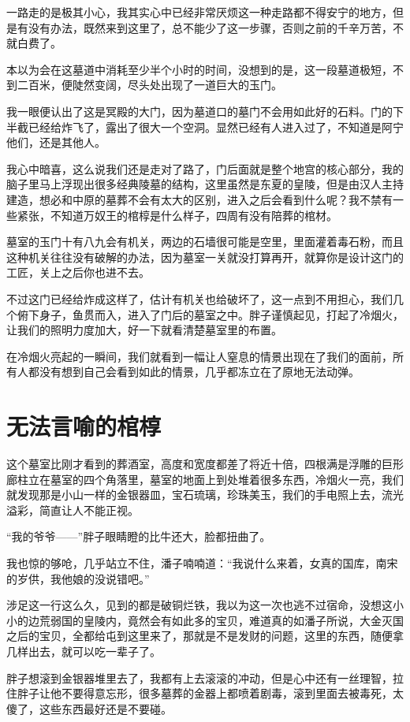 一路走的是极其小心，我其实心中已经非常厌烦这一种走路都不得安宁的地方，但是有没有办法，既然来到这里了，总不能少了这一步骤，否则之前的千辛万苦，不就白费了。

本以为会在这墓道中消耗至少半个小时的时间，没想到的是，这一段墓道极短，不到二百米，便陡然变阔，尽头处出现了一道巨大的玉门。

我一眼便认出了这是冥殿的大门，因为墓道口的墓门不会用如此好的石料。门的下半截已经给炸飞了，露出了很大一个空洞。显然已经有人进入过了，不知道是阿宁他们，还是其他人。

我心中暗喜，这么说我们还是走对了路了，门后面就是整个地宫的核心部分，我的脑子里马上浮现出很多经典陵墓的结构，这里虽然是东夏的皇陵，但是由汉人主持建造，想必和中原的墓葬不会有太大的区别，进入之后会看到什么呢？我不禁有一些紧张，不知道万奴王的棺椁是什么样子，四周有没有陪葬的棺材。

墓室的玉门十有八九会有机关，两边的石墙很可能是空里，里面灌着毒石粉，而且这种机关往往没有破解的办法，因为墓室一关就没打算再开，就算你是设计这门的工匠，关上之后你也进不去。

不过这门已经给炸成这样了，估计有机关也给破坏了，这一点到不用担心，我们几个俯下身子，鱼贯而入，进入了门后的墓室之中。胖子谨慎起见，打起了冷烟火，让我们的照明力度加大，好一下就看清楚墓室里的布置。

在冷烟火亮起的一瞬间，我们就看到一幅让人窒息的情景出现在了我们的面前，所有人都没有想到自己会看到如此的情景，几乎都冻立在了原地无法动弹。

\chapter{无法言喻的棺椁}

这个墓室比刚才看到的葬酒室，高度和宽度都差了将近十倍，四根满是浮雕的巨形廊柱立在墓室的四个角落里，墓室的地面上到处堆着很多东西，冷烟火一亮，我们就发现那是小山一样的金银器皿，宝石琉璃，珍珠美玉，我们的手电照上去，流光溢彩，简直让人不能正视。

“我的爷爷——”胖子眼睛瞪的比牛还大，脸都扭曲了。

我也惊的够呛，几乎站立不住，潘子喃喃道：“我说什么来着，女真的国库，南宋的岁供，我他娘的没说错吧。”

涉足这一行这么久，见到的都是破铜烂铁，我以为这一次也逃不过宿命，没想这小小的边荒弱国的皇陵内，竟然会有如此多的宝贝，难道真的如潘子所说，大金灭国之后的宝贝，全都给屯到这里来了，那就是不是发财的问题，这里的东西，随便拿几样出去，就可以吃一辈子了。

胖子想滚到金银器堆里去了，我都有上去滚滚的冲动，但是心中还有一丝理智，拉住胖子让他不要得意忘形，很多墓葬的金器上都喷着剧毒，滚到里面去被毒死，太傻了，这些东西最好还是不要碰。

